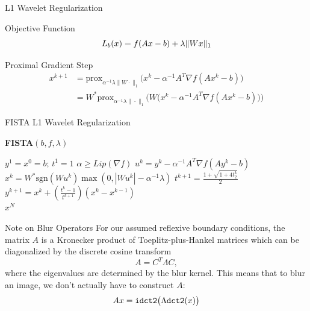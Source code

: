 \documentclass[12pt]{beamer}
\newcommand{\prox}{\text{prox}}
\begin{document}
\begin{frame}{L1 Wavelet Regularization}
\begin{block}{Objective Function}
\[ L_b(x) = f(Ax-b) + \lambda \| Wx \|_1 \vspace{1ex} \]
\end{block}

\vspace{2ex}
\begin{block}{Proximal Gradient Step}
\begin{align*}
x^{k+1} &= \prox_{\alpha^{-1}\lambda \| W \cdot \|_1} \Big(x^k - \alpha^{-1} A^T\nabla f (Ax^k - b)\Big) \\
&= W^* \prox_{\alpha^{-1}\lambda \| \cdot \|_1} \Big(W\big(x^k - \alpha^{-1} A^T\nabla f (Ax^k - b)\big)  \Big)  
\end{align*}
\end{block}
\end{frame}

\begin{frame}{FISTA L1 Wavelet Regularization}
\begin{center}
\begin{minipage}[T]{0.7\textwidth}
\textbf{FISTA$(b,f,\lambda)$}
\begin{algorithmic}
\State $y^1 = x^0 = b; \, t^1 = 1$
\State $\alpha \geq Lip(\nabla f)$
	\State $u^k = y^k - \alpha^{-1} A^T \nabla f(Ay^k-b)$ \vspace{1ex}
	\State $x^k = W^*\text{sgn}(Wu^k)\max(0,|Wu^k|-\alpha^{-1}\lambda)$ \vspace{1ex}
	\State $t^{k+1} = \frac{1+\sqrt{1+4t_2^k}}{2}$
	\State $y^{k+1} = x^k + \left(\frac{t^k-1}{t^{k+1}}\right) (x^k - x^{k-1})$
\EndFor\\
\Return $x^N$
\end{algorithmic}
\end{minipage}
\end{center}
\end{frame}

\begin{frame}{Note on Blur Operators}
For our assumed reflexive boundary conditions, the matrix $A$ is a Kronecker product of Toeplitz-plus-Hankel matrices which can be diagonalized by the discrete cosine transform
\[ A = C^T\Lambda C, \]
where the eigenvalues are determined by the blur kernel. This means that to blur an image, we don't actually have to construct $A$:
\[ Ax = {\tt idct2}\big(\Lambda {\tt dct2}(x)\big) \]
\end{frame}
\end{document}
